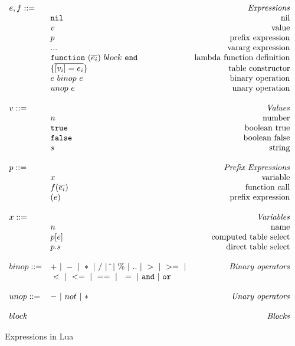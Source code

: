 


\newcommand{\mydefhead}[2]{\multicolumn{2}{l}{{#1}}&\mbox{\emph{#2}}\\}
\newcommand{\mydefcase}[2]{\qquad\qquad& #1 &\mbox{#2}\\}

\newcommand{\functiondef}[2]{\mbox{\tt function}~(\overline{#1_i})~#2~ {\tt end}}


\begin{figure}
\caption{Expressions in Lua}
\label{fig:LuaExp}
\[
\begin{array}{llr}
  \mydefhead{e,f ::=\qquad\qquad\qquad\qquad}{Expressions}
  \mydefcase{\tt nil}{nil}
  \mydefcase{v}{value}
  \mydefcase{p}{prefix expression}
  \mydefcase{\tt ...}{vararg expression}
  \mydefcase{\functiondef e {block}}{lambda function definition}
  \mydefcase{\{\overline{[v_i] = e_i}\}}{table constructor}
  \mydefcase{e ~binop~ e}{binary operation}
  \mydefcase{unop~ e}{unary operation}
  \\
  \mydefhead{v ::=\qquad\qquad\qquad\qquad}{Values}
  \mydefcase{n}{number}
  \mydefcase{\tt true}{boolean true}
  \mydefcase{\tt false}{boolean false}
  \mydefcase{s}{string}
  \\
  \mydefhead{p ::=\qquad\qquad\qquad\qquad}{Prefix Expressions}
  \mydefcase{x}{variable}
  \mydefcase{f(\overline{e_i})}{function call}
  \mydefcase{(e)}{prefix expression}
  
  \\
  \mydefhead{x ::=\qquad\qquad\qquad\qquad}{Variables}
  \mydefcase{n}{name}
  \mydefcase{p[e]}{computed table select}
  \mydefcase{p.s}{direct table select}
  \\
  binop ::= & + ~|~ - ~|~ * ~|~ / ~|~ \hat{} ~|~ \% ~|~ .. ~|~ > ~|~ >= ~|& \mbox{\emph{Binary operators}}\\
  \quad & ~ < ~|~ <= ~|~ == ~|~ ~= ~|~ {\tt and} ~|~ {\tt or} &  \\
  \\
  unop ::= & - ~|~ not ~|~ *  & \mbox{\emph{Unary operators}} \\
  \\
  \mydefhead{block \qquad\qquad\qquad\qquad}{Blocks}
\end{array}
\]
\end{figure}



